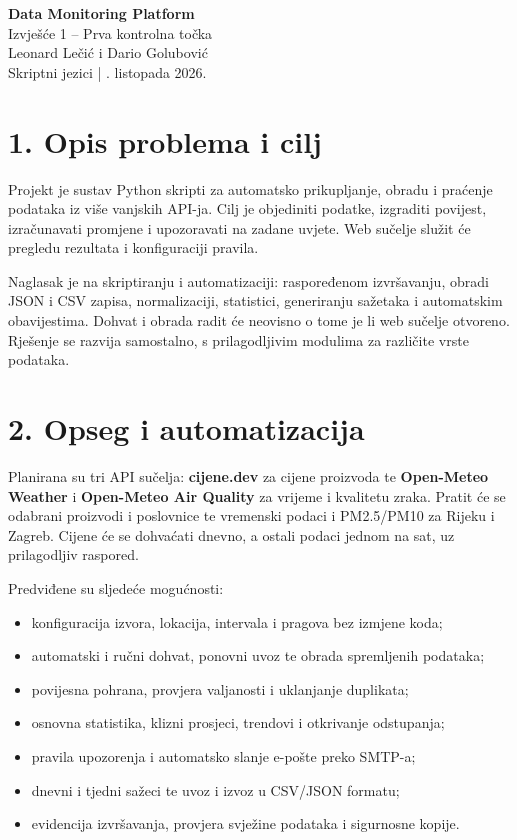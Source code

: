 \documentclass[a4paper,11pt]{article}
\begin{document}
\begin{center}
{\Large\bfseries Data Monitoring Platform}\\[5pt]
{\large Izvješće 1 -- Prva kontrolna točka}\\[7pt]
Leonard Lečić i Dario Golubović\\
Skriptni jezici \quad | . listopada 2026.
\end{center}

\section*{1. Opis problema i cilj}
Projekt je sustav Python skripti za automatsko prikupljanje, obradu i
praćenje podataka iz više vanjskih API-ja. Cilj je objediniti podatke,
izgraditi povijest, izračunavati promjene i upozoravati na zadane uvjete.
Web sučelje služit će pregledu rezultata i konfiguraciji pravila.

Naglasak je na skriptiranju i automatizaciji: raspoređenom izvršavanju,
obradi JSON i CSV zapisa, normalizaciji, statistici, generiranju sažetaka
i automatskim obavijestima. Dohvat i obrada radit će neovisno o tome je li
web sučelje otvoreno. Rješenje se razvija samostalno, s prilagodljivim
modulima za različite vrste podataka.

\section*{2. Opseg i automatizacija}
Planirana su tri API sučelja: \textbf{cijene.dev} za cijene proizvoda te
\textbf{Open-Meteo Weather} i \textbf{Open-Meteo Air Quality} za vrijeme
i kvalitetu zraka. Pratit će se odabrani proizvodi i poslovnice te
vremenski podaci i PM2.5/PM10 za Rijeku i Zagreb. Cijene će se dohvaćati
dnevno, a ostali podaci jednom na sat, uz prilagodljiv raspored.

Predviđene su sljedeće mogućnosti:
\begin{itemize}
\item konfiguracija izvora, lokacija, intervala i pragova bez izmjene koda;
\item automatski i ručni dohvat, ponovni uvoz te obrada spremljenih podataka;
\item povijesna pohrana, provjera valjanosti i uklanjanje duplikata;
\item osnovna statistika, klizni prosjeci, trendovi i otkrivanje odstupanja;
\item pravila upozorenja i automatsko slanje e-pošte preko SMTP-a;
\item dnevni i tjedni sažeci te uvoz i izvoz u CSV/JSON formatu;
\item evidencija izvršavanja, provjera svježine podataka i sigurnosne kopije.
\end{itemize}
\end{document}
